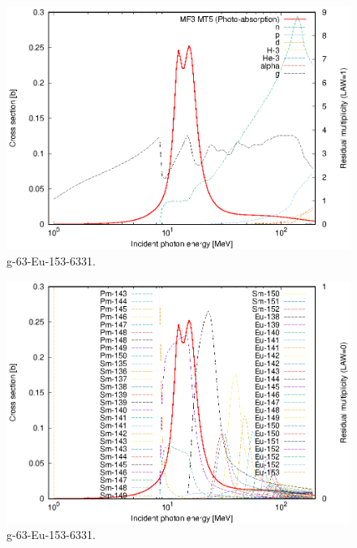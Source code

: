 \begin{figure}
 \includegraphics[width=\linewidth]{eps/g_63-Eu-153_6331.eps}
  \caption{g-63-Eu-153-6331.}
\end{figure}
\begin{figure}
 \includegraphics[width=\linewidth]{eps-law0/g_63-Eu-153_6331.eps}
 \caption{g-63-Eu-153-6331.}
\end{figure}
\newpage \clearpage


